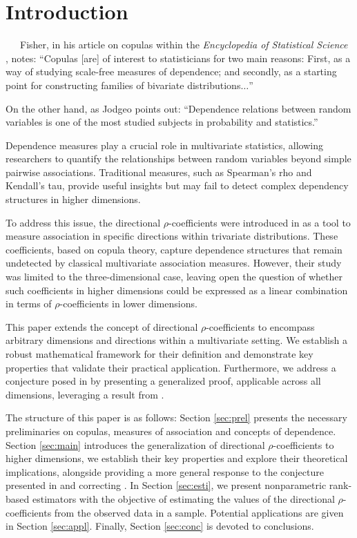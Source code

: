 \documentclass[11pt,a4paper]{article}
\begin{document}
\section{Introduction}\label{sec:copulas}

$\phantom{999}$Fisher, in his article on copulas within the {\it Encyclopedia of Statistical Science} \cite{Fisher97}, notes: ``Copulas [are] of interest to statisticians for two main reasons: First, as a way of studying scale-free measures of dependence; and secondly, as a starting point for
constructing families of bivariate distributions$\ldots$''

On the other hand, as Jodgeo \cite{Jodgeo82} points out: ``Dependence relations between random variables is one of the most studied subjects in probability and statistics.''

Dependence measures play a crucial role in multivariate statistics, allowing researchers to quantify the relationships between random variables beyond simple pairwise associations. Traditional measures, such as Spearman’s rho and Kendall’s tau, provide useful insights but may fail to detect complex dependency structures in higher dimensions.

To address this issue, the directional $\rho$-coefficients were introduced in \cite{Ne2011} as a tool to measure association in specific directions within trivariate distributions. These coefficients, based on copula theory, capture dependence structures that remain undetected by classical multivariate association measures. However, their study was limited to the three-dimensional case, leaving open the question of whether such coefficients in higher dimensions could be expressed as a linear combination in terms of $\rho$-coefficients in lower dimensions.

This paper extends the concept of directional $\rho$-coefficients to encompass arbitrary dimensions and directions within a multivariate setting. We establish a robust mathematical framework for their definition and demonstrate key properties that validate their practical application. Furthermore, we address a conjecture posed in \cite{Ne2011} by presenting a generalized proof, applicable across all dimensions, leveraging a result from \cite{Edeamo}.

The structure of this paper is as follows: Section \ref{sec:prel} presents the necessary preliminaries on copulas, measures of association and concepts of dependence. Section \ref{sec:main} introduces the generalization of directional $\rho$-coefficients to higher dimensions, we establish their key properties and explore their theoretical implications, alongside providing a more general response to the conjecture presented in \cite{Ne2011} and correcting \cite[Equation (10)]{Gar2013}. In Section \ref{sec:esti}, we present nonparametric rank-based estimators with the objective of estimating the values of the directional $\rho$-coefficients from the observed data in a sample. Potential applications are given in Section \ref{sec:appl}. Finally, Section \ref{sec:conc} is devoted to conclusions.
\end{document}
